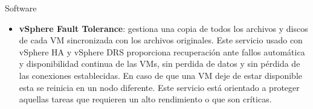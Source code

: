 \begin{section}{Software}
\begin{itemize}
    \item \textbf{vSphere Fault Tolerance}: gestiona una copia de todos los archivos y discos de cada VM sincronizada con los archivos originales. Este servicio usado con vSphere HA y vSphere DRS proporciona recuperación ante fallos automática y disponibilidad continua de las VMs, sin perdida de datos y sin pérdida de las conexiones establecidas. En caso de que una VM deje de estar disponible esta se reinicia en un nodo diferente. Este servicio está orientado a proteger aquellas tareas que requieren un alto rendimiento o que son críticas.
\end{itemize}
    
    
    

\end{section}
